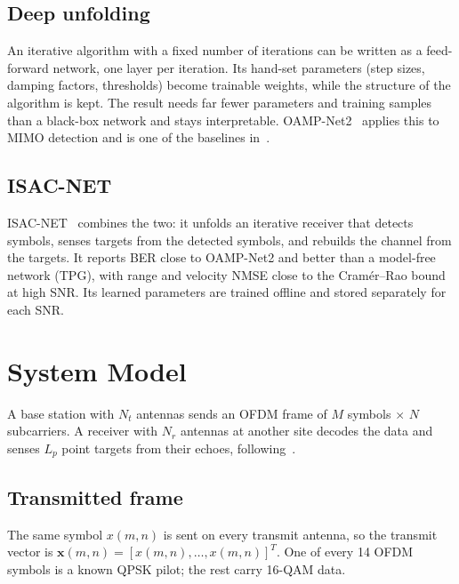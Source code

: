 \documentclass[11pt,a4paper]{article}
\begin{document}
\subsection{Deep unfolding}
An iterative algorithm with a fixed number of iterations can be written as a feed-forward network, one layer per iteration. Its hand-set parameters (step sizes, damping factors, thresholds) become trainable weights, while the structure of the algorithm is kept. The result needs far fewer parameters and training samples than a black-box network and stays interpretable. OAMP-Net2~\cite{oampnet} applies this to MIMO detection and is one of the baselines in~\cite{isacnet}.

\subsection{ISAC-NET}
ISAC-NET~\cite{isacnet} combines the two: it unfolds an iterative receiver that detects symbols, senses targets from the detected symbols, and rebuilds the channel from the targets. It reports BER close to OAMP-Net2 and better than a model-free network (TPG), with range and velocity NMSE close to the Cram\'er--Rao bound at high SNR. Its learned parameters are trained offline and stored separately for each SNR.

\section{System Model}\label{sec:model}
A base station with $N_t$ antennas sends an OFDM frame of $M$ symbols $\times$ $N$ subcarriers. A receiver with $N_r$ antennas at another site decodes the data and senses $L_p$ point targets from their echoes, following~\cite[Sec.~II]{isacnet}.

\subsection{Transmitted frame}
The same symbol $x(m,n)$ is sent on every transmit antenna, so the transmit vector is $\mathbf{x}(m,n)=[x(m,n),\dots,x(m,n)]^T$. One of every 14 OFDM symbols is a known QPSK pilot; the rest carry 16-QAM data.
\end{document}
